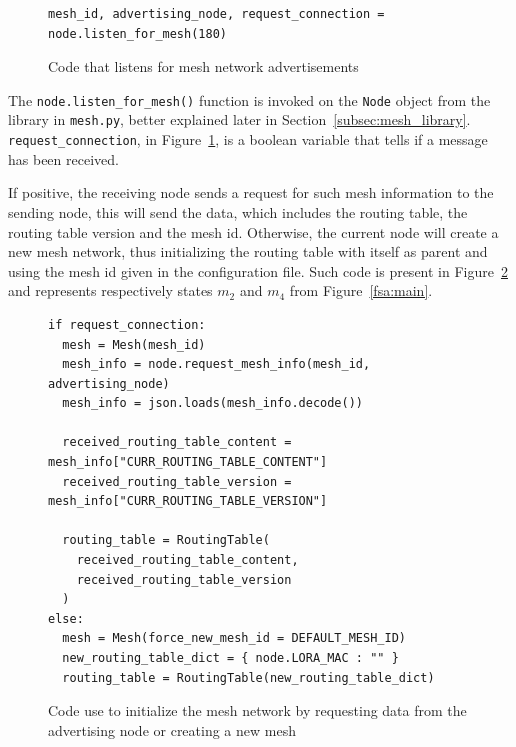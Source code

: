				\begin{figure}[H]
					\begin{lstlisting}
mesh_id, advertising_node, request_connection = node.listen_for_mesh(180)
					\end{lstlisting}		
					\caption{Code that listens for mesh network advertisements}
					\label{code:mesh_init_1}
				\end{figure}
			
				The \texttt{node.listen\_for\_mesh()} function is invoked on the \texttt{Node} object from the library in \texttt{mesh.py}, better explained later in Section~\ref{subsec:mesh_library}.				
				\texttt{request\_connection}, in Figure~\ref{code:mesh_init_1}, is a boolean variable that tells if a message has been received.
				
				If positive, the receiving node sends a request for such mesh information to the sending node, this will send the data, which includes the routing table, the routing table version and the mesh id.
				Otherwise, the current node will create a new mesh network, thus initializing the routing table with itself as parent and using the mesh id given in the configuration file.
				Such code is present in Figure~\ref{code:mesh_init_2} and represents respectively states $m_{2}$ and $m_{4}$ from Figure~\ref{fsa:main}.
									
				\begin{figure}	
					\begin{lstlisting}
if request_connection:
  mesh = Mesh(mesh_id)
  mesh_info = node.request_mesh_info(mesh_id, advertising_node)
  mesh_info = json.loads(mesh_info.decode())

  received_routing_table_content = mesh_info["CURR_ROUTING_TABLE_CONTENT"]
  received_routing_table_version = mesh_info["CURR_ROUTING_TABLE_VERSION"]
  
  routing_table = RoutingTable(
    received_routing_table_content, 
    received_routing_table_version
  )
else:
  mesh = Mesh(force_new_mesh_id = DEFAULT_MESH_ID)
  new_routing_table_dict = { node.LORA_MAC : "" }
  routing_table = RoutingTable(new_routing_table_dict)
					\end{lstlisting}
					\caption{Code use to initialize the mesh network by requesting data from the advertising node or creating a new mesh}
					\label{code:mesh_init_2}
				\end{figure}
			
	
